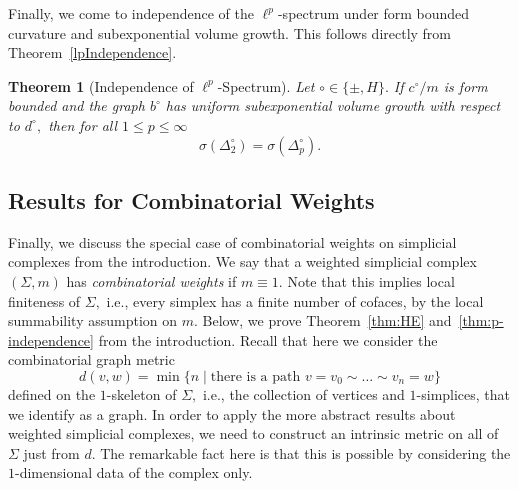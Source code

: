 \documentclass[10pt]{amsart}
\newtheorem{theorem}{Theorem}[section]
\theoremstyle{definition}
\begin{document}
Finally, we come to  independence of the $\ell^p$-spectrum under form bounded curvature and subexponential volume growth. This follows directly from Theorem~\ref{lpIndependence}.

\begin{theorem}[Independence of $\ell^p$-Spectrum]\label{lpIndependenceSC}
   Let $\circ\in\{\pm,H\}.$ If $c^\circ\slash m$ is form bounded  and the graph $b^\circ$ has uniform subexponential volume growth with respect to $d^\circ,$ then for all $1\leq p\leq\infty$ \[\sigma( \Delta^\circ_2) = \sigma( \Delta^\circ_p).\]
\end{theorem}


\subsection{Results for Combinatorial Weights}\label{s:combinatorial}

Finally, we discuss the special case of combinatorial weights on simplicial complexes from the introduction. We say that a weighted simplicial complex $( \Sigma,m)$ has \textit{combinatorial weights} if $m\equiv1$. Note that this implies local finiteness of $\Sigma,$ i.e., every simplex has a finite number of cofaces, by the local summability assumption on $m.$ Below, we prove Theorem~\ref{thm:HE} and~\ref{thm:p-independence} from the introduction.
Recall that here we consider the combinatorial graph metric
\[d(v,w)=\min\{ n\mid \mbox{there is a path } {v=v_{0}\sim\ldots\sim v_{n}=w}\}\]
defined on the $1$-skeleton of $\Sigma,$ i.e., the collection of vertices and $1$-simplices, that we identify as a graph.
In order to apply the more abstract results about weighted simplicial complexes, we need to construct an intrinsic metric on all of $\Sigma$ just from $d.$ The remarkable fact here is that this is possible by considering the $1$-dimensional data of the complex only.
\end{document}
